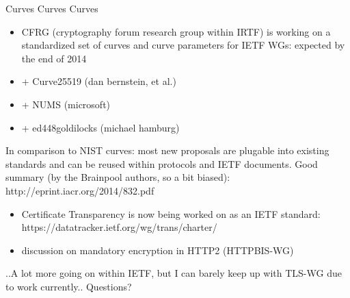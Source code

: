\begin{frame}{Curves Curves Curves}
  \begin{itemize}
    \item CFRG (cryptography forum research group within IRTF) is working on a standardized set of curves and curve parameters for IETF WGs: expected by the end of 2014
    \item + Curve25519 (dan bernstein, et al.)
    \item + NUMS (microsoft)
    \item + ed448goldilocks (michael hamburg)
  \end{itemize}
In comparison to NIST curves: most new proposals are plugable into existing standards and can be reused within protocols and IETF documents.
\newline
\newline
Good summary (by the Brainpool authors, so a bit biased): http://eprint.iacr.org/2014/832.pdf
\end{frame}

\begin{frame}
  \begin{itemize}
    \item Certificate Transparency is now being worked on as an IETF standard: https://datatracker.ietf.org/wg/trans/charter/
    \item discussion on mandatory encryption in HTTP2 (HTTPBIS-WG)
  \end{itemize}
\end{frame}

\begin{frame}
..A lot more going on within IETF, but I can barely keep up with TLS-WG due to work currently..
\newline
\newline
Questions?
\end{frame}
